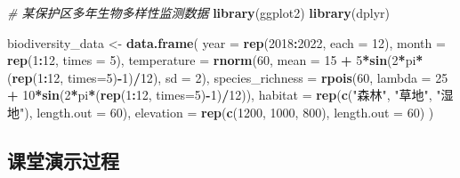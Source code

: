 \documentclass[
  twoside]{book}
\newenvironment{Shaded}{\begin{snugshade}}{\end{snugshade}}
\newcommand{\AttributeTok}[1]{\textcolor[rgb]{0.13,0.29,0.53}{#1}}
\newcommand{\CommentTok}[1]{\textcolor[rgb]{0.56,0.35,0.01}{\textit{#1}}}
\newcommand{\DecValTok}[1]{\textcolor[rgb]{0.00,0.00,0.81}{#1}}
\newcommand{\FunctionTok}[1]{\textcolor[rgb]{0.13,0.29,0.53}{\textbf{#1}}}
\newcommand{\NormalTok}[1]{#1}
\newcommand{\OtherTok}[1]{\textcolor[rgb]{0.56,0.35,0.01}{#1}}
\newcommand{\SpecialCharTok}[1]{\textcolor[rgb]{0.81,0.36,0.00}{\textbf{#1}}}
\newcommand{\StringTok}[1]{\textcolor[rgb]{0.31,0.60,0.02}{#1}}
\begin{document}
\begin{Shaded}
\begin{Highlighting}[]
\CommentTok{\# 某保护区多年生物多样性监测数据}
\FunctionTok{library}\NormalTok{(ggplot2)}
\FunctionTok{library}\NormalTok{(dplyr)}

\NormalTok{biodiversity\_data }\OtherTok{\textless{}{-}} \FunctionTok{data.frame}\NormalTok{(}
  \AttributeTok{year =} \FunctionTok{rep}\NormalTok{(}\DecValTok{2018}\SpecialCharTok{:}\DecValTok{2022}\NormalTok{, }\AttributeTok{each =} \DecValTok{12}\NormalTok{),}
  \AttributeTok{month =} \FunctionTok{rep}\NormalTok{(}\DecValTok{1}\SpecialCharTok{:}\DecValTok{12}\NormalTok{, }\AttributeTok{times =} \DecValTok{5}\NormalTok{),}
  \AttributeTok{temperature =} \FunctionTok{rnorm}\NormalTok{(}\DecValTok{60}\NormalTok{, }\AttributeTok{mean =} \DecValTok{15} \SpecialCharTok{+} \DecValTok{5}\SpecialCharTok{*}\FunctionTok{sin}\NormalTok{(}\DecValTok{2}\SpecialCharTok{*}\NormalTok{pi}\SpecialCharTok{*}\NormalTok{(}\FunctionTok{rep}\NormalTok{(}\DecValTok{1}\SpecialCharTok{:}\DecValTok{12}\NormalTok{, }\AttributeTok{times=}\DecValTok{5}\NormalTok{)}\SpecialCharTok{{-}}\DecValTok{1}\NormalTok{)}\SpecialCharTok{/}\DecValTok{12}\NormalTok{), }\AttributeTok{sd =} \DecValTok{2}\NormalTok{),}
  \AttributeTok{species\_richness =} \FunctionTok{rpois}\NormalTok{(}\DecValTok{60}\NormalTok{, }\AttributeTok{lambda =} \DecValTok{25} \SpecialCharTok{+} \DecValTok{10}\SpecialCharTok{*}\FunctionTok{sin}\NormalTok{(}\DecValTok{2}\SpecialCharTok{*}\NormalTok{pi}\SpecialCharTok{*}\NormalTok{(}\FunctionTok{rep}\NormalTok{(}\DecValTok{1}\SpecialCharTok{:}\DecValTok{12}\NormalTok{, }\AttributeTok{times=}\DecValTok{5}\NormalTok{)}\SpecialCharTok{{-}}\DecValTok{1}\NormalTok{)}\SpecialCharTok{/}\DecValTok{12}\NormalTok{)),}
  \AttributeTok{habitat =} \FunctionTok{rep}\NormalTok{(}\FunctionTok{c}\NormalTok{(}\StringTok{"森林"}\NormalTok{, }\StringTok{"草地"}\NormalTok{, }\StringTok{"湿地"}\NormalTok{), }\AttributeTok{length.out =} \DecValTok{60}\NormalTok{),}
  \AttributeTok{elevation =} \FunctionTok{rep}\NormalTok{(}\FunctionTok{c}\NormalTok{(}\DecValTok{1200}\NormalTok{, }\DecValTok{1000}\NormalTok{, }\DecValTok{800}\NormalTok{), }\AttributeTok{length.out =} \DecValTok{60}\NormalTok{)}
\NormalTok{)}
\end{Highlighting}
\end{Shaded}

\hypertarget{ux8bfeux5802ux6f14ux793aux8fc7ux7a0b-9}{%
\subsection{课堂演示过程}\label{ux8bfeux5802ux6f14ux793aux8fc7ux7a0b-9}}
\end{document}
